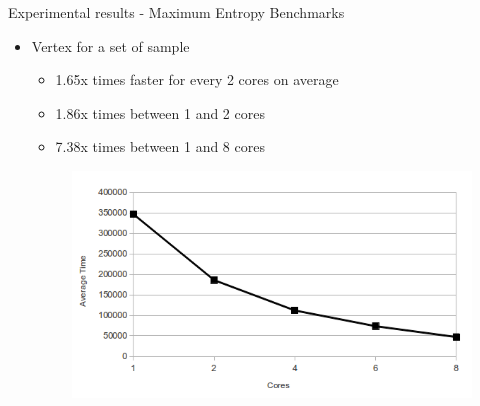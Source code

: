 \documentclass{beamer}
\begin{document}
\begin{frame}{Experimental results - Maximum Entropy Benchmarks}

\begin{itemize}

\item{Vertex for a set of sample}

\begin{itemize}
\item 1.65x times faster for every 2 cores on average
\item 1.86x times between 1 and 2 cores
\item 7.38x times between 1 and 8 cores
\end{itemize}

\begin{figure}[!htb]
  \centering
  \includegraphics[scale=0.35]{maxent_plot.png}
  \label{fig:maxent_plot}
\end{figure}

\end{itemize}

\end{frame}

\end{document}
